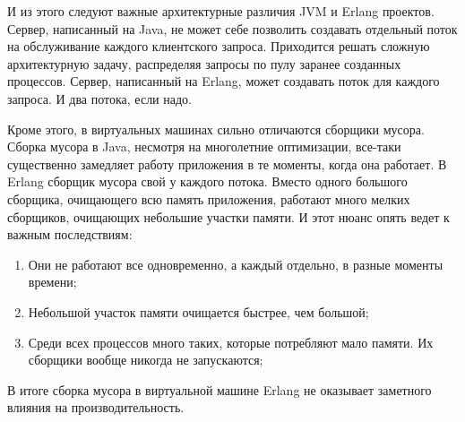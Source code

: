 \documentclass[10pt, a5paper]{article}
\begin{document}
И из этого следуют важные архитектурные различия JVM и Erlang проектов. Сервер, написанный на Java, не может себе позволить создавать отдельный поток на обслуживание каждого клиентского запроса. Приходится решать сложную архитектурную задачу, распределяя запросы по пулу заранее созданных процессов. Сервер, написанный на Erlang, может создавать поток для каждого запроса. И два потока, если надо.

Кроме этого, в виртуальных машинах сильно отличаются сборщики мусора. Сборка мусора в Java, несмотря на многолетние оптимизации, все-таки существенно замедляет работу приложения в те моменты, когда она работает. В Erlang сборщик мусора свой у каждого потока. Вместо одного большого сборщика, очищающего всю память приложения, работают много мелких сборщиков, очищающих небольшие участки памяти. И этот нюанс опять ведет к важным последствиям:

\begin{enumerate}
  \item Они не работают все одновременно, а каждый отдельно, в разные моменты времени;
  \item Небольшой участок памяти очищается быстрее, чем большой;
  \item Среди всех процессов много таких, которые потребляют мало памяти. Их сборщики вообще никогда не запускаются;
\end{enumerate}

В итоге сборка мусора в виртуальной машине Erlang не оказывает заметного влияния на производительность.
\end{document}
